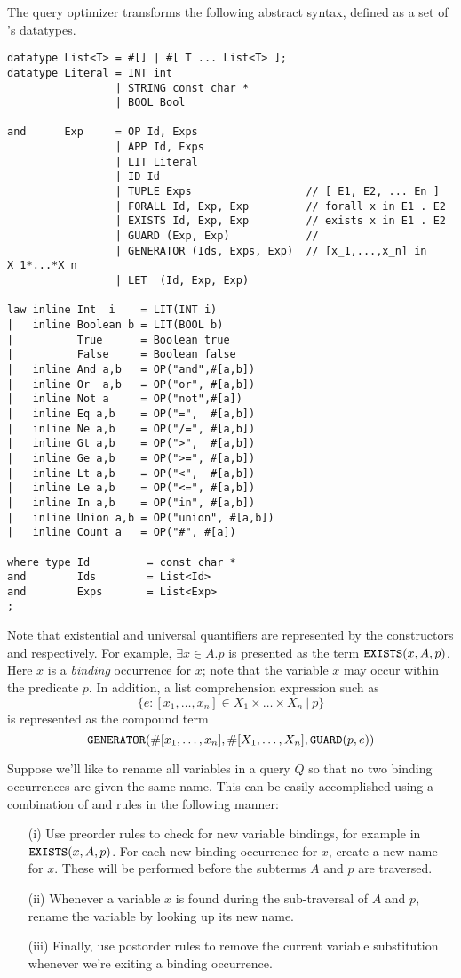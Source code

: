 The query optimizer transforms the following abstract syntax, defined
as a set of \Prop's datatypes.  
\begin{verbatim}
datatype List<T> = #[] | #[ T ... List<T> ];
datatype Literal = INT int
                 | STRING const char *
                 | BOOL Bool

and      Exp     = OP Id, Exps
                 | APP Id, Exps
                 | LIT Literal
                 | ID Id
                 | TUPLE Exps                  // [ E1, E2, ... En ]
                 | FORALL Id, Exp, Exp         // forall x in E1 . E2
                 | EXISTS Id, Exp, Exp         // exists x in E1 . E2
                 | GUARD (Exp, Exp)            //
                 | GENERATOR (Ids, Exps, Exp)  // [x_1,...,x_n] in X_1*...*X_n
                 | LET  (Id, Exp, Exp)

law inline Int  i    = LIT(INT i)
|   inline Boolean b = LIT(BOOL b)
|          True      = Boolean true
|          False     = Boolean false
|   inline And a,b   = OP("and",#[a,b])
|   inline Or  a,b   = OP("or", #[a,b])
|   inline Not a     = OP("not",#[a])
|   inline Eq a,b    = OP("=",  #[a,b])
|   inline Ne a,b    = OP("/=", #[a,b])
|   inline Gt a,b    = OP(">",  #[a,b])
|   inline Ge a,b    = OP(">=", #[a,b])
|   inline Lt a,b    = OP("<",  #[a,b])
|   inline Le a,b    = OP("<=", #[a,b])
|   inline In a,b    = OP("in", #[a,b])
|   inline Union a,b = OP("union", #[a,b])
|   inline Count a   = OP("#", #[a])

where type Id         = const char *
and        Ids        = List<Id>
and        Exps       = List<Exp>
;
\end{verbatim}

Note that existential and 
universal quantifiers are represented by the constructors 
and  respectively.  For example, $\exists x \in A.p$ is
presented as the term ${\tt EXISTS}(x,A,p)$.  Here $x$ is a {\em binding}
occurrence for $x$; note that the variable $x$ may occur within 
the predicate $p$.  In addition, a list comprehension
expression such as 
\[ \{ e : [x_1,\ldots,x_n] \in X_1 
\times \ldots \times X_n\ |\ p \} \] 
is represented as the compound term 
\[
  {\tt GENERATOR}(\#[x_1,\ldots,x_n],\#[X_1,\ldots,X_n],{\tt GUARD}(p,e))
\]

Suppose we'll like to rename all variables in a query $Q$ 
so that no two binding occurrences are given the same name.  
This can be easily accomplished using a combination
of  and  rules in the following manner: 
\begin{enumerate}
\item[(i)] Use preorder rules to check for new variable bindings,
for example in ${\tt EXISTS}(x,A,p)$.
For each new binding occurrence for $x$, create
a new name for $x$.  
These will be performed before the subterms $A$ and $p$ are traversed.
\item[(ii)] Whenever a variable $x$ is found during the sub-traversal
of $A$ and $p$, rename the variable by looking up its new name.
\item[(iii)] Finally, use postorder rules to remove the current 
variable substitution whenever we're exiting a binding occurrence.
\end{enumerate}

